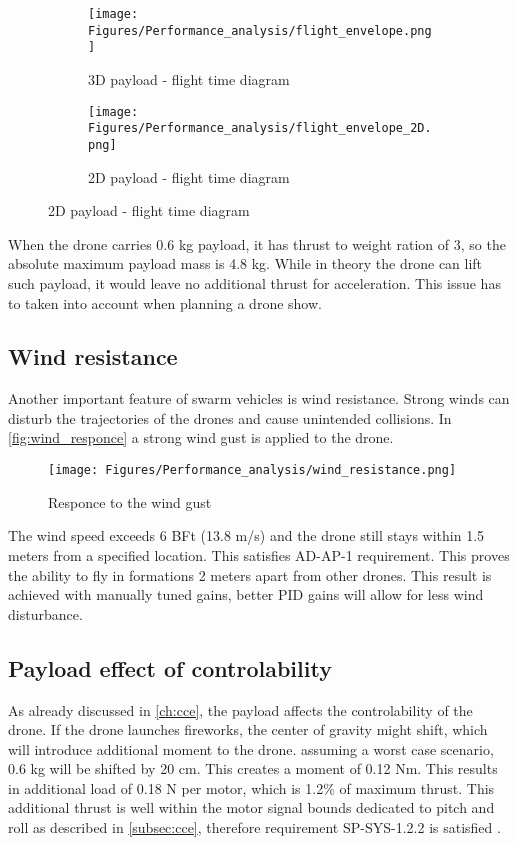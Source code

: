 \begin{figure}[H]
     \centering
     \begin{subfigure}{0.48\textwidth}
         \centering
         \texttt{[image: Figures/Performance\_analysis/flight\_envelope.png]}
         \caption{3D payload - flight time diagram}
         \label{fig:flight_envelope_3D}
     \end{subfigure}
     \hfill
     \begin{subfigure}{0.48\textwidth}
         \centering
         \texttt{[image: Figures/Performance\_analysis/flight\_envelope\_2D.png]}
         \caption{2D payload - flight time diagram}
         \label{fig:flight_envelope_2D}
     \end{subfigure}
     \hfill
\end{figure}

When the drone carries 0.6 kg payload, it has thrust to weight ration of 3, so the absolute maximum payload mass is 4.8 kg. While in theory the drone can lift such payload, it would leave no additional thrust for acceleration. This issue has to taken into account when planning a drone show.  

\subsection{Wind resistance} \label{subsec:wind_resistance}
Another important feature of swarm vehicles is wind resistance. Strong winds can disturb the trajectories of the drones and cause unintended collisions. In \autoref{fig:wind_responce} a strong wind gust is applied to the drone. 

\begin{figure}[H]
    \centering
    \texttt{[image: Figures/Performance\_analysis/wind\_resistance.png]}
    \caption{Responce to the wind gust}
    \label{fig:wind_responce}
\end{figure}
The wind speed exceeds 6 BFt (13.8 m/s) and the drone still stays within 1.5 meters from a specified location. This satisfies AD-AP-1 requirement. This proves the ability to fly in formations 2 meters apart from other drones. This result is achieved with manually tuned gains, better PID gains will allow for less wind disturbance. 

\subsection{Payload effect of controlability} \label{subsec:payload_control}
As already discussed in \autoref{ch:cce}, the payload affects the controlability of the drone. If the drone launches fireworks, the center of gravity might shift, which will introduce additional moment to the drone. assuming a worst case scenario, 0.6 kg will be shifted by 20 cm. This creates a moment of 0.12 Nm. This results in additional load of 0.18 N per motor, which is 1.2\% of maximum thrust. This additional thrust is well within the  motor signal bounds dedicated to pitch and roll as described in  \autoref{subsec:cce}, therefore requirement SP-SYS-1.2.2 is satisfied .

